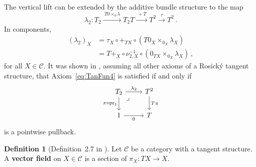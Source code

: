 \documentclass[12pt,reqno, a4paper]{amsart}
\numberwithin{equation}{section}
\theoremstyle{plain}
\theoremstyle{definition}
\newtheorem{Definition}[Theorem]{Definition}
\theoremstyle{remark}
\newcommand{\calC}{\mathcal{C}}
\newcommand{\Id}{\mathrm{1}}
\newcommand{\pr}{\mathrm{pr}}
\begin{document}
The vertical lift can be extended by the additive bundle structure to the map
\begin{equation*}
  \lambda_2:
  T_2 \xrightarrow{~T0 \times_0 \lambda~}
  T_2 T
  \xrightarrow{~+T~}
  T^2
  \xrightarrow{~\tau~}
  T^2
  \,.
\end{equation*}
In components,
\begin{equation}
\label{eq:VertLiftExt}
\begin{split}
  (\lambda_2)_X
  &= \tau_X \circ {+_{TX}} \circ (T0_X \times_{0_X} \lambda_X)
  \\
  &= {T+_X} \circ \nu_{2,X}^{-1} \circ (0_{TX} \times_{0_X} \lambda_X)
  \,,
\end{split}
\end{equation}
for all $X \in \calC$. It was shown in \cite[Lem.~3.10]{CockettCruttwell:2014}, assuming all other axioms of a Rosick\'y tangent structure, that Axiom~\eqref{eq:TanFun4} is satisfied if and only if
\begin{equation}
\label{diag:lambda2pullback}
\begin{tikzcd}
T_2 \ar[r, "\lambda_2"] \ar[d, "\pi \circ \pr_1"']
\ar[dr, phantom, "\lrcorner", very near start]
&
T^2 \ar[d, "{T\pi}"]
\\
\Id \ar[r, "0"'] & T
\end{tikzcd}
\end{equation}
is a pointwise pullback.

\begin{Definition}[Definition~2.7 in \cite{AintablianBlohmann:2026}]
Let $\calC$ be a category with a tangent structure. A \textbf{vector field} on $X \in \calC$ is a section of $\pi_X: TX \to X$.
\end{Definition}
\end{document}
